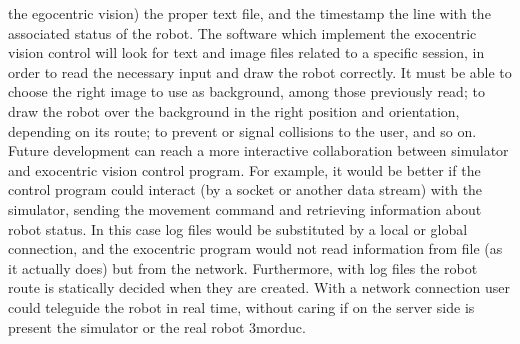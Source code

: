 the egocentric vision) the proper text file, and the timestamp the line with the associated status of the robot.
\newline The software which implement the exocentric vision control will look for text and image files related to a specific 
session, in order to read the necessary input and draw the robot correctly. It must be able to choose the right image to use as 
background, among those previously read; to draw the robot over the background in the right position and orientation, depending 
on its route; to prevent or signal collisions to the user, and so on.
\newline Future development can reach a more interactive collaboration between simulator and exocentric vision control program. For
example, it would be better if the control program could interact (by a socket or another data stream) with the simulator, sending
the movement command and retrieving information about robot status. In this case log files would be substituted by a local or 
global connection, and the exocentric program would not read information from file (as it actually does) but from the network.
Furthermore, with log files the robot route is statically decided when they are created. With a network connection user
could teleguide the robot in real time, without caring if on the server side is present the simulator or the real robot 3morduc.
